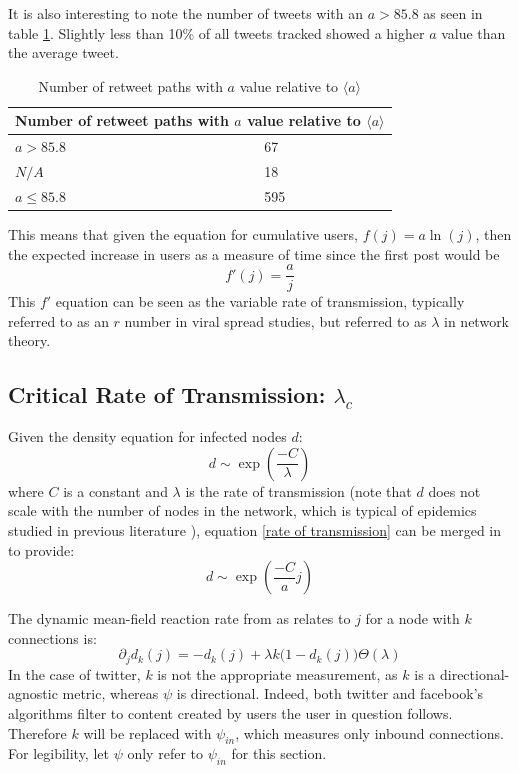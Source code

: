 \documentclass[NETN,manuscript]{stjour-new}
\begin{document}
It is also interesting to note the number of tweets with an $a > 85.8$ as seen in table \ref{a > 85.58}. Slightly less than 10\% of all tweets tracked showed a higher $a$ value than the average tweet.
\begin{table}[h!]
\centering
\begin{tabular}{ |p{3cm}|p{3cm}|  }
\hline
\multicolumn{2}{|c|}{Number of retweet paths with $a$ value relative to $\langle a \rangle$} \\
\hline
$a > 85.8$  & 67\\
$N/A$ & 18 \\
$ a \leq 85.8$ & 595 \\
\hline
\end{tabular}
\caption{Number of retweet paths with $a$ value relative to $\langle a \rangle$}
\label{a > 85.58}
\end{table}

This means that given the equation for cumulative users, $f(j) = a \ln(j)$, then the expected increase in users as a measure of time since the first post would be 
\begin{equation}
\label{rate of transmission}
    f'(j) = \frac{a}{j} 
\end{equation}
This $f'$ equation can be seen as the variable rate of transmission, typically referred to as an $r$ number in viral spread studies, but referred to as $\lambda$ in network theory. 
\subsection{Critical Rate of Transmission: $\lambda_c$}

Given the density equation for infected nodes $d$: \begin{equation}
    \label{densityequation}
    d \sim \exp\left(\frac{ - C}{\lambda}\right)
\end{equation} where $C$ is a constant and $\lambda$ is the rate of transmission \citep{pastor2001epidemic} (note that $d$ does not scale with the number of nodes in the network, which is typical of epidemics studied in previous literature \citep{marro2005nonequilibrium}), equation \ref{rate of transmission} can be merged in to provide:
\begin{equation}
    d \sim \exp\left(\frac{ - C}{a}j\right)
\end{equation}


The dynamic mean-field reaction rate from \citep{marro2005nonequilibrium} as relates to $j$ for a node with $k$ connections is: 
\begin{equation}
\label{dynamic mean-field reaction rate}
    \partial_jd_k(j) = - d_k(j) + \lambda k \big(1 - d_k(j)\big)\Theta(\lambda)
\end{equation}
In the case of twitter, $k$ is not the appropriate measurement, as $k$ is a directional-agnostic metric, whereas $\psi$ is directional. Indeed, both twitter and facebook's algorithms filter to content created by users the user in question follows. Therefore $k$ will be replaced with $\psi_{in}$, which measures only inbound connections. For legibility, let $\psi$ only refer to $\psi_{in}$ for this section.
\end{document}
